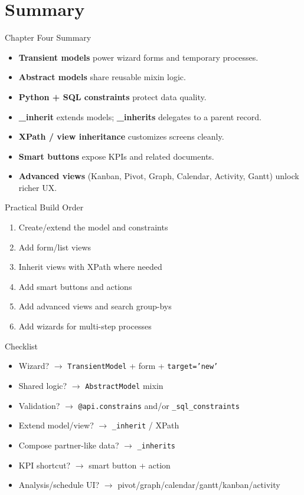 \section{Summary}

\begin{frame}{Chapter Four Summary}
	\begin{itemize}
		\item \textbf{Transient models} power wizard forms and temporary processes.
		\item \textbf{Abstract models} share reusable mixin logic.
		\item \textbf{Python + SQL constraints} protect data quality.
		\item \textbf{\_inherit} extends models; \textbf{\_inherits} delegates to a parent record.
		\item \textbf{XPath / view inheritance} customizes screens cleanly.
		\item \textbf{Smart buttons} expose KPIs and related documents.
		\item \textbf{Advanced views} (Kanban, Pivot, Graph, Calendar, Activity, Gantt) unlock richer UX.
	\end{itemize}
\end{frame}

\begin{frame}{Practical Build Order}
	\begin{enumerate}
		\item Create/extend the model and constraints
		\item Add form/list views
		\item Inherit views with XPath where needed
		\item Add smart buttons and actions
		\item Add advanced views and search group-bys
		\item Add wizards for multi-step processes
	\end{enumerate}
\end{frame}

\begin{frame}{Checklist}
	\begin{itemize}
		\item Wizard? $\rightarrow$ \texttt{TransientModel} + form + \texttt{target='new'}
		\item Shared logic? $\rightarrow$ \texttt{AbstractModel} mixin
		\item Validation? $\rightarrow$ \texttt{@api.constrains} and/or \texttt{\_sql\_constraints}
		\item Extend model/view? $\rightarrow$ \texttt{\_inherit} / XPath
		\item Compose partner-like data? $\rightarrow$ \texttt{\_inherits}
		\item KPI shortcut? $\rightarrow$ smart button + action
		\item Analysis/schedule UI? $\rightarrow$ pivot/graph/calendar/gantt/kanban/activity
	\end{itemize}
\end{frame}

